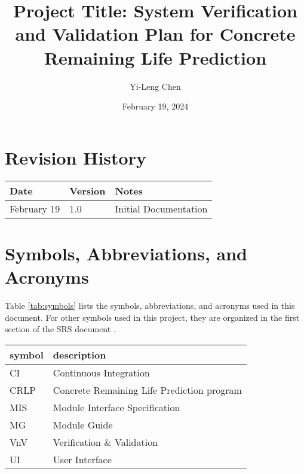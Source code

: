 \documentclass[12pt, titlepage]{article}
\begin{document}
\title{Project Title: System Verification and Validation Plan for Concrete Remaining Life Prediction} 
\author{Yi-Leng Chen}
\date{February 19, 2024}
	
\maketitle


\section*{Revision History}

\begin{tabularx}{\textwidth}{p{3cm}p{2cm}X}
\toprule {\bf Date} & {\bf Version} & {\bf Notes}\\
\midrule
February 19 & 1.0 & Initial Documentation\\

\bottomrule
\end{tabularx}

\newpage

\tableofcontents

\listoftables

\newpage

\section{Symbols, Abbreviations, and Acronyms}

Table \ref{tab:symbols} lists the symbols, abbreviations, and acronyms used in this document. For other symbols used in this project, they are organized in the first section of the SRS document \cite{srs}.
\newline

\renewcommand{\arraystretch}{1.2}
\begin{tabular}{l l} 
  \toprule		
  \textbf{symbol} & \textbf{description}\\
  \midrule 
  CI & Continuous Integration \\
  CRLP & Concrete Remaining Life Prediction program \\
  MIS & Module Interface Specification \\
  MG & Module Guide \\
  VnV & Verification \& Validation \\
  UI & User Interface\\
  \bottomrule
\end{tabular}\\
\label{tab:symbols}
\end{document}
